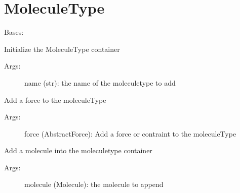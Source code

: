 \documentclass[letterpaper,10pt,english]{sphinxmanual}
\begin{document}
\chapter{MoleculeType}
\label{moleculeType:moleculetype}\label{moleculeType:module-ctools.MoleculeType}\label{moleculeType::doc}

\begin{fulllineitems}
\label{moleculeType:ctools.MoleculeType.MoleculeType}
Bases: 

Initialize the MoleculeType container
\begin{description}
\item[{Args:}] \leavevmode
name (str): the name of the moleculetype to add

\end{description}


\begin{fulllineitems}
\label{moleculeType:ctools.MoleculeType.MoleculeType.addForce}
Add a force to the moleculeType
\begin{description}
\item[{Args:}] \leavevmode
force (AbstractForce): Add a force or contraint to the moleculeType

\end{description}

\end{fulllineitems}



\begin{fulllineitems}
\label{moleculeType:ctools.MoleculeType.MoleculeType.addMolecule}
Add a molecule into the moleculetype container
\begin{description}
\item[{Args:   }] \leavevmode
molecule (Molecule): the molecule to append

\end{description}

\end{fulllineitems}



\end{fulllineitems}
\end{document}
